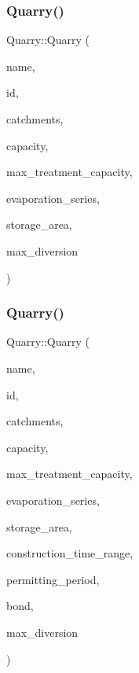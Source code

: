 \mbox{\label{classQuarry_a28c4db26230c2ff3f82c8c0f70f2f124}} 
\subsubsection{\texorpdfstring{Quarry()}{Quarry()}\hspace{0.1cm}{\footnotesize\ttfamily [3/5]}}
{\footnotesize\ttfamily Quarry\+::\+Quarry (\begin{DoxyParamCaption}\item[{const char $\ast$}]{name,  }\item[{const int}]{id,  }\item[{const vector$<$ \mbox{\hyperlink{classCatchment}{Catchment}} $\ast$$>$ \&}]{catchments,  }\item[{const double}]{capacity,  }\item[{const double}]{max\+\_\+treatment\+\_\+capacity,  }\item[{\mbox{\hyperlink{classEvaporationSeries}{Evaporation\+Series}} \&}]{evaporation\+\_\+series,  }\item[{double}]{storage\+\_\+area,  }\item[{double}]{max\+\_\+diversion }\end{DoxyParamCaption})}

\mbox{\label{classQuarry_a561616791620a55709bfca645bc8cbad}} 
\subsubsection{\texorpdfstring{Quarry()}{Quarry()}\hspace{0.1cm}{\footnotesize\ttfamily [4/5]}}
{\footnotesize\ttfamily Quarry\+::\+Quarry (\begin{DoxyParamCaption}\item[{const char $\ast$}]{name,  }\item[{const int}]{id,  }\item[{const vector$<$ \mbox{\hyperlink{classCatchment}{Catchment}} $\ast$$>$ \&}]{catchments,  }\item[{const double}]{capacity,  }\item[{const double}]{max\+\_\+treatment\+\_\+capacity,  }\item[{\mbox{\hyperlink{classEvaporationSeries}{Evaporation\+Series}} \&}]{evaporation\+\_\+series,  }\item[{double}]{storage\+\_\+area,  }\item[{const vector$<$ double $>$ \&}]{construction\+\_\+time\+\_\+range,  }\item[{double}]{permitting\+\_\+period,  }\item[{\mbox{\hyperlink{classBond}{Bond}} \&}]{bond,  }\item[{double}]{max\+\_\+diversion }\end{DoxyParamCaption})}

